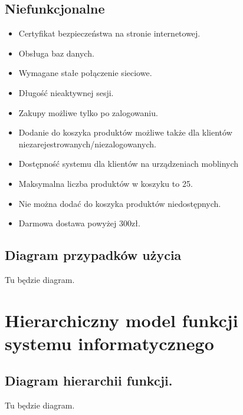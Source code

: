 \documentclass[a4paper,11pt]{article}
\begin{document}
\subsection {Niefunkcjonalne}
\begin{itemize}
	\item Certyfikat bezpieczeństwa na stronie internetowej.
	\item Obsługa baz danych.
	\item Wymagane stałe połączenie sieciowe.
	\item Długość nieaktywnej sesji.
	\item Zakupy możliwe tylko po zalogowaniu.
	\item Dodanie do koszyka produktów możliwe także dla klientów niezarejestrowanych/niezalogowanych.
	\item Dostępność systemu dla klientów na urządzeniach moblinych
	\item Maksymalna liczba produktów w koszyku to 25.
	\item Nie można dodać do koszyka produktów niedostępnych.
	\item Darmowa dostawa powyżej 300zł.
\end{itemize}

\subsection {Diagram przypadków użycia}
Tu będzie diagram.

\section {Hierarchiczny model funkcji systemu informatycznego}
\subsection {Diagram hierarchii funkcji.}
Tu będzie diagram.
\end{document}
